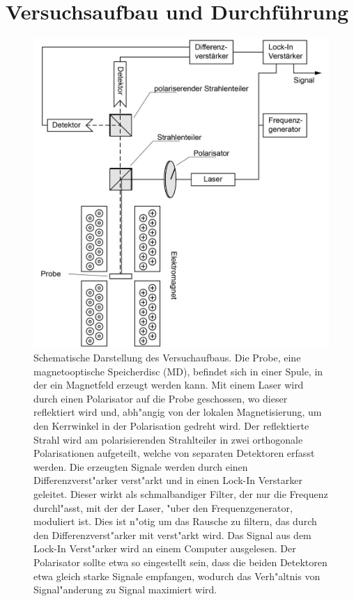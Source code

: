 \section{Versuchsaufbau und Durchf\"uhrung}

\begin{figure}[hp]
    \centering
    \includegraphics[width=1\textwidth]{../images/aufbau.png}
    \caption{
        Schematische Darstellung des Versuchaufbaus.
        Die Probe, eine magnetooptische Speicherdisc (MD), befindet sich in einer Spule, in der ein Magnetfeld erzeugt werden kann.
        Mit einem Laser wird durch einen Polarisator auf die Probe geschossen, wo dieser reflektiert wird und, abh"angig von der lokalen Magnetisierung, um den Kerrwinkel in der Polarisation gedreht wird.
        Der reflektierte Strahl wird am polarisierenden Strahlteiler in zwei orthogonale Polarisationen aufgeteilt, welche von separaten Detektoren erfasst werden.
        Die erzeugten Signale werden durch einen Differenzverst"arker verst"arkt und in einen Lock-In Verstarker geleitet.
        Dieser wirkt als schmalbandiger Filter, der nur die Frequenz durchl"asst, mit der der Laser, "uber den Frequenzgenerator, moduliert ist.
        Dies ist n"otig um das Rausche zu filtern, das durch den Differenzverst"arker mit verst"arkt wird.
        Das Signal aus dem Lock-In Verst"arker wird an einem Computer ausgelesen.
        Der Polarisator sollte etwa so eingestellt sein, dass die beiden Detektoren etwa gleich starke Signale empfangen, wodurch das Verh"altnis von Signal"anderung zu Signal maximiert wird.
        }
    \label{fig:aufbau}
\end{figure}


